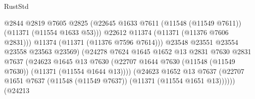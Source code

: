 \begin{lexlean}{RustStd}
\begin{coremodule}
                                              @2844
                                              @2819
                                              @7605
                                              @2825
                                              (@22645
                                                @1633
                                                @7611
                                                (@11548 (@11549 @7611))
                                                (@11371 (@11554 @1633 @53)))
                                              @22612
                                              @11374
                                              (@11371 (@11376 @7606 @2831)))
                                            @11374
                                            (@11371 (@11376 @7596 @7614)))
                                          @23548
                                          @23551
                                          @23554
                                          @23558
                                          @23563
                                          @23569)
                                        (@24278
                                          @7624
                                          @1645
                                          @1652
                                          @13
                                          @2831
                                          @7630
                                          @2831
                                          @7637
                                          (@24623
                                            @1645
                                            @13
                                            @7630
                                            (@22707
                                              @1644
                                              @7630
                                              (@11548 (@11549 @7630))
                                              (@11371 (@11554 @1644 @13))))
                                          (@24623
                                            @1652
                                            @13
                                            @7637
                                            (@22707
                                              @1651
                                              @7637
                                              (@11548 (@11549 @7637))
                                              (@11371 (@11554 @1651 @13))))))
                                      (@24213

\end{coremodule}
\end{lexlean}
